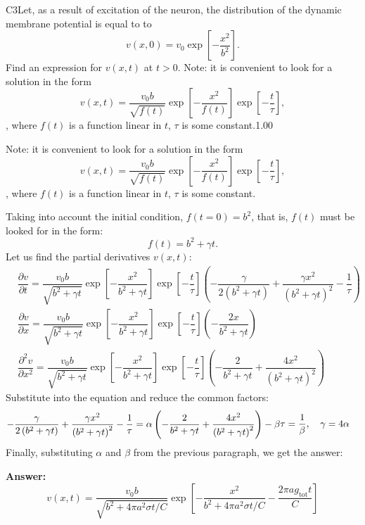 \documentclass[11pt,a4paper]{article}
\begin{document}
\begin{solcard}{C3}{Let, as a result of excitation of the neuron, the distribution of the dynamic membrane potential is equal to to \[v(x,0)=v_0\exp\left[-\dfrac{x^2}{b^2}\right].\]Find an expression for $v(x,t)$ at $t > 0$. Note: it is convenient to look for a solution in the form \[v(x,t)=\dfrac{v_0b}{\sqrt{f(t)}}\exp\left[-\dfrac{x^2}{f(t)}\right]\exp\left[-\dfrac{t}{\tau}\right],\], where $f(t)$ is a function linear in $t$, $\tau$ is some constant.}{1.00}

Note: it is convenient to look for a solution in the form \[v(x,t)=\dfrac{v_0b}{\sqrt{f(t)}}\exp\left[-\dfrac{x^2}{f(t)}\right]\exp\left[-\dfrac{t}{\tau}\right],\], where $f(t)$ is a function linear in $t$, $\tau$ is some constant.


Taking into account the initial condition, $f(t=0)=b^2$, that is, $f(t)$ must be looked for in the form:\[f(t)=b^2+\gamma t.\]Let us find the partial derivatives $v(x,t)$:\[\begin{aligned}&\dfrac{\partial v}{\partial t}=\dfrac{v_0b}{\sqrt{b^2+\gamma t}}\exp\left[-\dfrac{x^2}{b^2+\gamma t}\right]\exp\left[-\dfrac{t}{\tau}\right]\left(-\dfrac{\gamma}{2\left(b^2+\gamma t\right)}+\dfrac{\gamma x^2}{\left(b^2+\gamma t\right)^2}-\dfrac{1}{\tau}\right)\\ &\dfrac{\partial v}{\partial x}=\dfrac{v_0b}{\sqrt{b^2+\gamma t}}\exp\left[-\dfrac{x^2}{b^2+\gamma t}\right]\exp\left[-\dfrac{t}{\tau}\right]\left(-\dfrac{2x}{b^2+\gamma t}\right)\\ &\dfrac{\partial^2v}{\partial x^2}=\dfrac{v_0b}{\sqrt{b^2+\gamma t}}\exp\left[-\dfrac{x^2}{b^2+\gamma t}\right]\exp\left[-\dfrac{t}{\tau}\right]\left(-\dfrac{2}{b^2+\gamma t}+\dfrac{4x^2}{\left(b^2+\gamma t\right)^2}\right)\end{aligned}\]Substitute into the equation and reduce the common factors:\[-\dfrac{\gamma}{2\left(b^2+\gamma t\right)}+\dfrac{\gamma x^2}{\left(b^2+\gamma t\right)^2}-\dfrac{1}{\tau}=\alpha\left(-\dfrac{2}{b^2+\gamma t}+\dfrac{4x^2}{\left(b^2+\gamma t\right)^2}\right)-\beta\\~\\\begin{aligned}&\tau=\dfrac{1}{\beta},\quad \gamma=4\alpha\end{aligned}\]Finally, substituting $\alpha$ and $\beta$ from the previous paragraph, we get the answer:

\par\smallskip\noindent\textbf{Answer:} \[v(x,t) = \dfrac{v_0b}{\sqrt{b^2+4\pi a^2\sigma t/C}}\exp\left[-\dfrac{x^2}{b^2+4\pi a^2\sigma t/C}-\dfrac{2\pi ag_{\mathrm{tot}}t}{C}\right]\]
\end{solcard}
\end{document}
